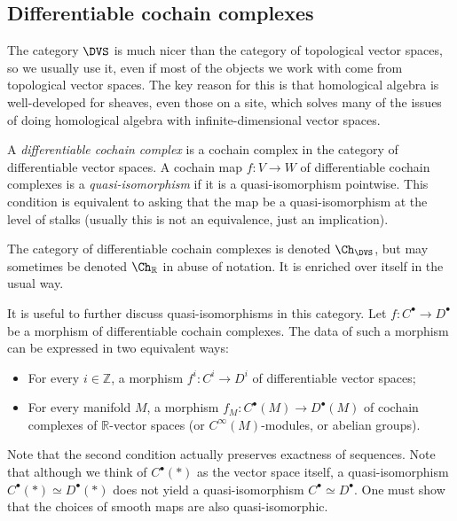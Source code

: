\subsection{Differentiable cochain complexes}

The category $\DVS $ is much nicer than the category of topological vector spaces, so we usually use it, even if most of the objects we work with come from topological vector spaces. The key reason for this is that homological algebra is well-developed for sheaves, even those on a site, which solves many of the issues of doing homological algebra with infinite-dimensional vector spaces.

\begin{definition}\label{dfn:3-5-9}
	A \emph{differentiable cochain complex} is a cochain complex in the category of differentiable vector spaces. A cochain map $f : V \to W$ of differentiable cochain complexes is a \emph{quasi-isomorphism} if it is a quasi-isomorphism pointwise. This condition is equivalent to asking that the map be a quasi-isomorphism at the level of stalks (usually this is not an equivalence, just an implication).
\end{definition}

The category of differentiable cochain complexes is denoted $\Ch_{\DVS } $, but may sometimes be denoted $\Ch_{\mathbb{R} } $ in abuse of notation. It is enriched over itself in the usual way.

\begin{discussion}\label{disc:3-5-10}
	It is useful to further discuss quasi-isomorphisms in this category. Let $f : C^{\bullet}  \to D^{\bullet} $ be a morphism of differentiable cochain complexes. The data of such a morphism can be expressed in two equivalent ways:
	\begin{itemize}
		\item For every $i\in\mathbb{Z} $, a morphism $f^i : C^i \to D^i$ of differentiable vector spaces;
		\item For every manifold $M$, a morphism $f_M : C^{\bullet} (M) \to D^{\bullet} (M)$ of cochain complexes of $\mathbb{R} $-vector spaces (or $C^\infty (M)$-modules, or abelian groups).
	\end{itemize}
	Note that the second condition actually preserves exactness of sequences. Note that although we think of $C^{\bullet} (*)$ as the vector space itself, a quasi-isomorphism $C^{\bullet} (*) \simeq D^{\bullet} (*)$ does not yield a quasi-isomorphism $C^{\bullet} \simeq D^{\bullet} $. One must show that the choices of smooth maps are also quasi-isomorphic.
\end{discussion}


